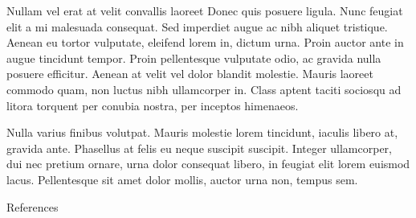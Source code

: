 \documentclass[final]{beamer}
\newlength{\sepwidth}
\newcommand{\separatorcolumn}{\begin{column}{\sepwidth}\end{column}}
\begin{document}
\begin{frame}[label={sec:org5a641b0}]{}
\begin{columns}
\begin{column}{0.3\columnwidth}
\begin{block}{Nullam vel erat at velit convallis laoreet}
Donec quis posuere ligula. Nunc feugiat elit a mi malesuada consequat. Sed
imperdiet augue ac nibh aliquet tristique. Aenean eu tortor vulputate, eleifend
lorem in, dictum urna. Proin auctor ante in augue tincidunt tempor. Proin
pellentesque vulputate odio, ac gravida nulla posuere efficitur. Aenean at velit
vel dolor blandit molestie. Mauris laoreet commodo quam, non luctus nibh
ullamcorper in. Class aptent taciti sociosqu ad litora torquent per conubia
nostra, per inceptos himenaeos.

Nulla varius finibus volutpat. Mauris molestie lorem tincidunt, iaculis libero
at, gravida ante. Phasellus at felis eu neque suscipit suscipit.  Integer
ullamcorper, dui nec pretium ornare, urna dolor consequat libero, in feugiat
elit lorem euismod lacus. Pellentesque sit amet dolor mollis, auctor urna non,
tempus sem.
\end{block}

\begin{block}{References}
\nocite{*}
\footnotesize{}

\end{block}
\end{column}
\end{columns}
\end{frame}
\end{document}
